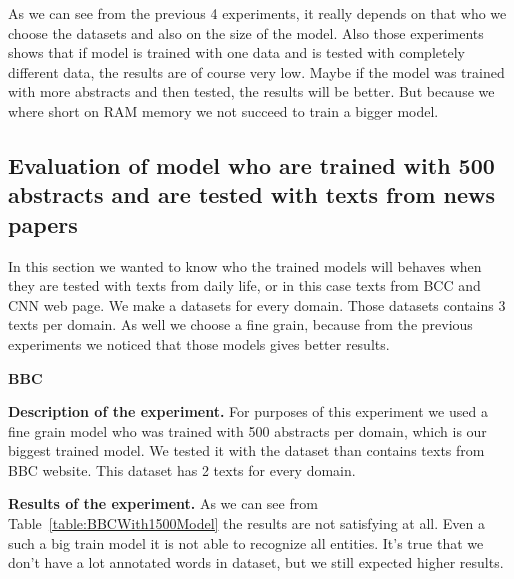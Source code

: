 \documentclass[thesis=M,english]{FITthesis}[2018/05/30]
\begin{document}
	
	As we can see from the previous 4 experiments, it really depends on that who we choose the datasets and also on the size of the model. Also those experiments shows that if model is trained with one data and is tested with completely different data, the results are of course very low. Maybe if the model was trained with more abstracts and then tested, the results will be better. But because we where short on RAM memory we  not succeed to train a bigger model.
\subsection{Evaluation of model who are trained with 500 abstracts and are tested with texts from news papers}\label{NewsPapersEvaluation}
In this section we wanted to know who the trained models will behaves when they are tested with texts from daily life, or in this case texts from BCC and CNN web page. We make a datasets for every domain. Those datasets contains 3 texts per domain. As well we choose a fine grain, because from the previous experiments we noticed that those models gives better results.


\textbf{BBC}

\textbf{Description of the experiment.} For purposes of this experiment we used a fine grain model who was trained with 500 abstracts per domain, which is our biggest trained model. We tested it with the dataset than contains texts from BBC website. This dataset has 2 texts for every domain.

\textbf{Results of the experiment.} As we can see from Table~\ref{table:BBCWith1500Model} the results are not satisfying at all. Even a such a big train model it is not able to recognize all entities. It's true that we don't have a lot annotated words in dataset, but we still expected higher results.
\end{document}
